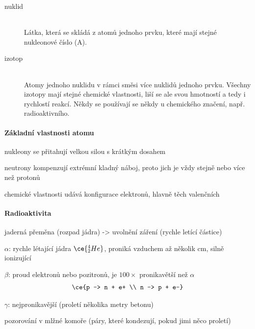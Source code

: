 \documentclass[DIV=8]{scrreprt}
\begin{document}
\begin{description}
\item[nuklid]\hfill \\
Látka, která se skládá z atomů jednoho prvku, které mají stejné nukleonové číslo (A).


\item[izotop]\hfill \\
Atomy jednoho nuklidu v rámci směsi více nuklidů jednoho prvku. Všechny izotopy mají stejné chemické vlastnosti, liší se ale svou hmotností a tedy i rychlostí reakcí. Někdy se používají se někdy u chemického značení, např. radioaktivního.

\end{description}


\paragraph{Základní vlastnosti atomu}
\begin{myItemize}[nosep]
    \item nukleony se přitahují velkou silou s krátkým dosahem
    \item neutrony kompenzují extrémní kladný náboj, proto jich je vždy stejně nebo více než protonů
    \item chemické vlastnosti udává konfigurace elektronů, hlavně těch valenčních
\end{myItemize}



\paragraph{Radioaktivita}
\begin{myItemize}[nosep]
    \item jaderná přeměna (rozpad jádra) -> uvolnění záření (rychle letící částice)
    \item \(\alpha\): rychle létající jádra \(\ce{^4_2He}\), proniká vzduchem až několik cm, silně ionizující
    \item \(\beta\): proud elektronů nebo pozitronů, je \(100\times\) pronikavětší než \(\alpha\) \[\ce{p -> n + e+ \\ n -> p + e-}\]
    \item \(\gamma\): nejpronikavější (proletí několika metry betonu)
\begin{myItemize}[nosep]
    \item pozorování v mlžné komoře (páry, které kondezují, pokud jimi něco proletí)
\end{myItemize}

\end{myItemize}
\end{document}
